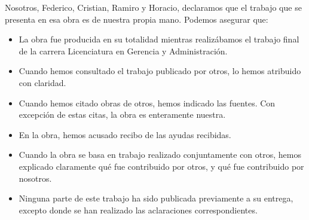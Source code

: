 \label{ch:declaracion-de-autoria}


Nosotros, Federico, Cristian, Ramiro y Horacio, declaramos que el trabajo que se presenta en esa obra es de nuestra propia mano. Podemos asegurar que:
\begin{itemize}
    \item La obra fue producida en su totalidad mientras realizábamos el trabajo final de la carrera Licenciatura en Gerencia y Administración.
    \item Cuando hemos consultado el trabajo publicado por otros, lo hemos atribuido con claridad.
    \item Cuando hemos citado obras de otros, hemos indicado las fuentes. Con excepción de estas citas, la obra es enteramente nuestra.
    \item En la obra, hemos acusado recibo de las ayudas recibidas.
    \item Cuando la obra se basa en trabajo realizado conjuntamente con otros, hemos explicado claramente qué fue contribuido por otros, y qué fue contribuido por nosotros.
    \item Ninguna parte de este trabajo ha sido publicada previamente a su entrega, excepto donde se han realizado las aclaraciones correspondientes.
\end{itemize}

